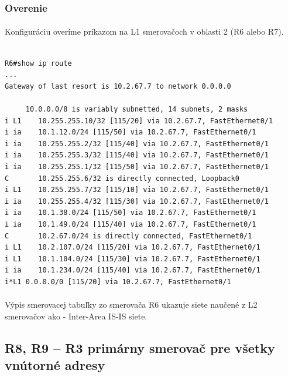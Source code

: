 \documentclass[12pt,twoside,a4paper]{report}
\begin{document}
\subsubsection{Overenie}
\paragraph{}
Konfiguráciu overíme príkazom  na L1 smerovačoch v oblasti 2 (R6 alebo R7).

\noindent
{\selectfont
\begin{small}
\begin{verbatim}

R6#show ip route
...
Gateway of last resort is 10.2.67.7 to network 0.0.0.0

     10.0.0.0/8 is variably subnetted, 14 subnets, 2 masks
i L1    10.255.255.10/32 [115/20] via 10.2.67.7, FastEthernet0/1
i ia    10.1.12.0/24 [115/50] via 10.2.67.7, FastEthernet0/1
i ia    10.255.255.2/32 [115/40] via 10.2.67.7, FastEthernet0/1
i ia    10.255.255.3/32 [115/40] via 10.2.67.7, FastEthernet0/1
i ia    10.255.255.1/32 [115/50] via 10.2.67.7, FastEthernet0/1
C       10.255.255.6/32 is directly connected, Loopback0
i L1    10.255.255.7/32 [115/10] via 10.2.67.7, FastEthernet0/1
i ia    10.255.255.4/32 [115/30] via 10.2.67.7, FastEthernet0/1
i ia    10.1.38.0/24 [115/50] via 10.2.67.7, FastEthernet0/1
i ia    10.1.49.0/24 [115/40] via 10.2.67.7, FastEthernet0/1
C       10.2.67.0/24 is directly connected, FastEthernet0/1
i L1    10.2.107.0/24 [115/20] via 10.2.67.7, FastEthernet0/1
i L1    10.1.104.0/24 [115/30] via 10.2.67.7, FastEthernet0/1
i ia    10.1.234.0/24 [115/40] via 10.2.67.7, FastEthernet0/1
i*L1 0.0.0.0/0 [115/20] via 10.2.67.7, FastEthernet0/1

\end{verbatim}
\end{small}
}

\paragraph{}
Výpis smerovacej tabuľky zo smerovača R6 ukazuje siete naučené z L2 smerovačov ako  - Inter-Area IS-IS siete.





\subsection{R8, R9 – R3 primárny smerovač pre všetky vnútorné adresy}
\label{R8_primarny_smerovac}
\end{document}
